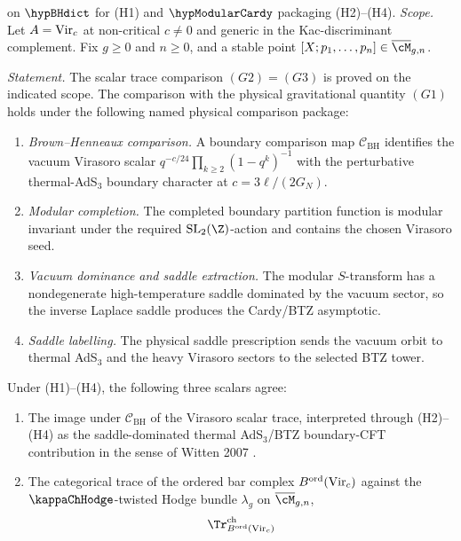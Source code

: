 \begin{theorem}
\ClaimStatusConditional{} on $\hypBHdict$ for (H1) and $\hypModularCardy$
packaging (H2)--(H4).
\emph{Scope.} Let $A = \mathrm{Vir}_{c}$ at non-critical $c \neq 0$ and generic
in the Kac-discriminant complement. Fix $g \ge 0$ and $n \ge 0$, and a
stable point $[X; p_{1}, \ldots, p_{n}] \in \overline{\cM}_{g, n}$.

\emph{Statement.} The scalar trace comparison $(G2)=(G3)$ is proved on
the indicated scope. The comparison with the physical gravitational
quantity $(G1)$ holds under the following named physical comparison
package:
\begin{enumerate}[label=\textup{(H\arabic*)}]
\item \emph{Brown--Henneaux comparison.} A boundary comparison map
 \(\mathcal C_{\mathrm{BH}}\) identifies the vacuum Virasoro scalar
 \(q^{-c/24}\prod_{k\ge2}(1-q^k)^{-1}\) with the perturbative
 thermal-AdS$_3$ boundary character at
 \(c=3\ell/(2G_N)\).
\item \emph{Modular completion.} The completed boundary partition
 function is modular invariant under the required
 \(\mathrm{SL}_2(\Z)\)-action and contains the chosen Virasoro seed.
\item \emph{Vacuum dominance and saddle extraction.} The modular
 \(S\)-transform has a nondegenerate high-temperature saddle dominated
 by the vacuum sector, so the inverse Laplace saddle produces the
 Cardy/BTZ asymptotic.
\item \emph{Saddle labelling.} The physical saddle prescription sends
 the vacuum orbit to thermal AdS$_3$ and the heavy Virasoro sectors to
 the selected BTZ tower.
\end{enumerate}
Under \textup{(H1)--(H4)}, the following three scalars agree:
\begin{enumerate}
\item[(G1)] The image under \(\mathcal C_{\mathrm{BH}}\) of the
 Virasoro scalar trace, interpreted through \textup{(H2)--(H4)} as the
 saddle-dominated thermal AdS$_3$/BTZ boundary-CFT contribution in the
 sense of Witten 2007 \cite{Witten2007}.
 \item[(G2)] The categorical trace of the ordered bar complex
 $B^{\mathrm{ord}}(\mathrm{Vir}_{c})$ against the $\kappaChHodge$-twisted Hodge
 bundle $\lambda_{g}$ on $\overline{\cM}_{g, n}$,
 \[
 \Tr_{B^{\mathrm{ord}}(\Vir_{c})}^{\mathrm{ch}}
\]
\end{enumerate}
\end{theorem}
